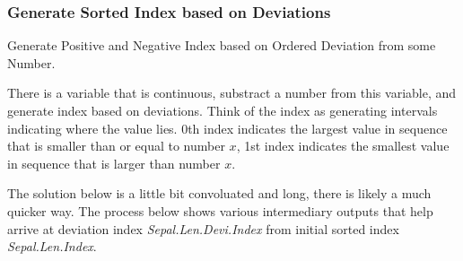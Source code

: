 \documentclass[
]{book}
\begin{document}
\begin{table}[!h]
\centering
{}
\end{table}

\hypertarget{generate-sorted-index-based-on-deviations}{%
\subsubsection{Generate Sorted Index based on Deviations}\label{generate-sorted-index-based-on-deviations}}

Generate Positive and Negative Index based on Ordered Deviation from some Number.

There is a variable that is continuous, substract a number from this variable, and generate index based on deviations. Think of the index as generating intervals indicating where the value lies. 0th index indicates the largest value in sequence that is smaller than or equal to number \(x\), 1st index indicates the smallest value in sequence that is larger than number \(x\).

The solution below is a little bit convoluated and long, there is likely a much quicker way. The process below shows various intermediary outputs that help arrive at deviation index \emph{Sepal.Len.Devi.Index} from initial sorted index \emph{Sepal.Len.Index}.
\end{document}

